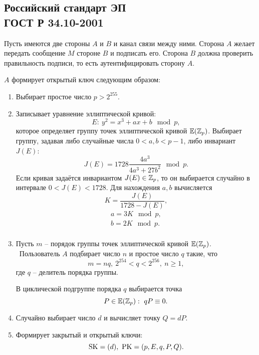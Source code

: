 \subsection[Российский стандарт ЭП ГОСТ Р 34.10-2001]{Российский стандарт ЭП \protect\\ ГОСТ Р 34.10-2001}

Пусть имеются две стороны $A$ и $B$ и канал связи между ними. Сторона $A$ желает передать сообщение $M$ стороне $B$ и подписать его. Сторона $B$ должна проверить правильность подписи, то есть аутентифицировать сторону $A$.

$A$ формирует открытый ключ следующим образом:

\begin{enumerate}
    \item Выбирает простое число $p > 2^{255}$.
    \item Записывает уравнение эллиптической кривой:
        \[ E: ~ y^2 = x^3 + a x + b \mod p, \]
        которое определяет группу точек эллиптической кривой $\mathbb{E}(\mathbb{Z}_p)$.
        Выбирает группу, задавая либо случайные числа $0 < a, b < p-1$, либо инвариант $J(E)$:
        \[ J(E) = 1728 \frac{4 a^3}{4 a^3 + 27 b^2} \mod p. \]
        Если кривая задаётся инвариантом $J(E) \in \mathbb{Z}_p$, то он выбирается случайно в интервале $0 < J(E) < 1728$. Для нахождения $a,b$ вычисляется
        \[ K = \frac{J(E)}{1728 - J(E)}, \]
        \[ \begin{array}{l}
            a = 3 K \mod p, \\
            b = 2 K \mod p. \\
        \end{array} \]
    \item Пусть $m$ -- порядок группы точек эллиптической кривой $\mathbb{E}(\mathbb{Z}_p)$. ~Пользователь $A$ подбирает число $n$ и простое число $q$ такие, что
        \[ m = n q, ~ 2^{254} < q < 2^{256}, ~ n \geq 1, \]
        где $q$ -- делитель порядка группы.

        В циклической подгруппе порядка $q$ выбирается точка
        \[ P \in \mathbb{E}(\mathbb{Z}_p): ~ q P \equiv 0. \]
    \item Случайно выбирает число $d$ и вычисляет точку $Q = d P$.
    \item Формирует закрытый и открытый ключи:
        \[ \textrm{SK} = (d), ~ \textrm{PK} = (p, E, q, P, Q). \]
\end{enumerate}

